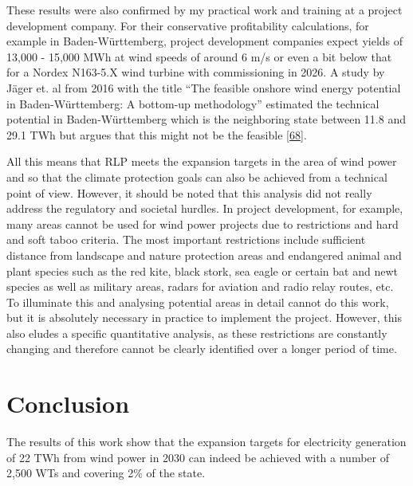 \documentclass[a4paper,11pt]{article}
\begin{document}
These results were also confirmed by my practical work and training at a project development company. For their conservative profitability calculations, for example in Baden-Württemberg, project development companies expect yields of 13,000 - 15,000 MWh at wind speeds of around 6 m/s or even a bit below that for a Nordex N163-5.X wind turbine with commissioning in 2026. A study by Jäger et. al from 2016 with the title ``The feasible onshore wind energy potential in Baden-Württemberg: A bottom-up methodology'' estimated the technical potential in Baden-Württemberg which is the neighboring state between 11.8 and 29.1 TWh but argues that this might not be the feasible {[}\protect\hyperlink{ref-Jager.2016}{68}{]}.

\newpage

All this means that RLP meets the expansion targets in the area of wind power and so that the climate protection goals can also be achieved from a technical point of view. However, it should be noted that this analysis did not really address the regulatory and societal hurdles. In project development, for example, many areas cannot be used for wind power projects due to restrictions and hard and soft taboo criteria. The most important restrictions include sufficient distance from landscape and nature protection areas and endangered animal and plant species such as the red kite, black stork, sea eagle or certain bat and newt species as well as military areas, radars for aviation and radio relay routes, etc. To illuminate this and analysing potential areas in detail cannot do this work, but it is absolutely necessary in practice to implement the project. However, this also eludes a specific quantitative analysis, as these restrictions are constantly changing and therefore cannot be clearly identified over a longer period of time.

\newpage

\hypertarget{conclusion}{%
\section{Conclusion}\label{conclusion}}

The results of this work show that the expansion targets for electricity generation of 22 TWh from wind power in 2030 can indeed be achieved with a number of 2,500 WTs and covering 2\% of the state.
\end{document}
